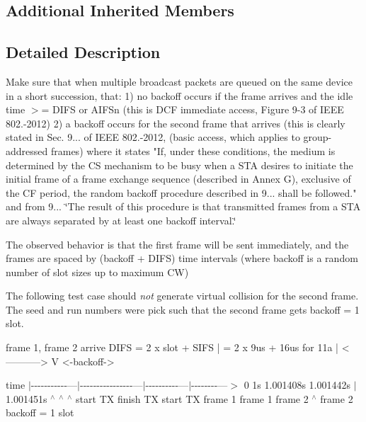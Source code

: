 \subsection*{Additional Inherited Members}


\subsection{Detailed Description}
Make sure that when multiple broadcast packets are queued on the same device in a short succession, that\+: 1) no backoff occurs if the frame arrives and the idle time $>$= D\+I\+FS or A\+I\+F\+Sn (this is \textquotesingle{}D\+CF immediate access\textquotesingle{}, Figure 9-\/3 of I\+E\+EE 802.-\/2012) 2) a backoff occurs for the second frame that arrives (this is clearly stated in Sec. 9... of I\+E\+EE 802.-\/2012, (basic access, which applies to group-\/addressed frames) where it states "If, under these conditions, the medium is determined by the CS mechanism to be busy when a S\+TA desires to initiate the initial frame of a frame exchange sequence (described in Annex G), exclusive of the CF period, the random backoff procedure described in 9... shall be followed." and from 9... \char`\"{}\+The result of this procedure is that transmitted
   frames from a S\+T\+A are always separated by at least one backoff interval.\char`\"{}

The observed behavior is that the first frame will be sent immediately, and the frames are spaced by (backoff + D\+I\+FS) time intervals (where backoff is a random number of slot sizes up to maximum CW)

The following test case should {\itshape not} generate virtual collision for the second frame. The seed and run numbers were pick such that the second frame gets backoff = 1 slot. \begin{DoxyVerb}                 frame 1, frame 2
                 arrive                DIFS = 2 x slot + SIFS
                 |                          = 2 x 9us + 16us for 11a
                 |                    <----------->
                 V                                 <-backoff->
\end{DoxyVerb}
 time $\vert$-\/-\/-\/-\/-\/-\/-\/-\/-\/-\/-\/---$\vert$-\/-\/-\/-\/-\/-\/-\/-\/-\/-\/-\/-\/-\/-\/-\/-\/---$\vert$-\/-\/-\/-\/-\/-\/-\/-\/-\/-\/---$\vert$-\/-\/-\/-\/-\/-\/-\/-\/---$>$ 0 1s 1.\+001408s 1.\+001442s $\vert$1.001451s $^\wedge$ $^\wedge$ $^\wedge$ start TX finish TX start TX frame 1 frame 1 frame 2 $^\wedge$ frame 2 backoff = 1 slot

